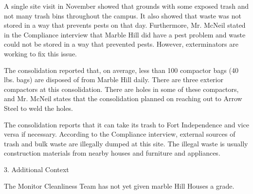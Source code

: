 A single site visit in November showed that grounds with some exposed trash and not many trash bins throughout the campus. It also showed that waste was not stored in a way that prevents pests on that day. Furthermore, Mr. McNeil stated in the Compliance interview that Marble Hill did have a pest problem and waste could not be stored in a way that prevented pests. However, exterminators are working to fix this issue.

The consolidation reported that, on average, less than 100 compactor bags (40 lbs. bags) are disposed of from Marble Hill daily. There are three exterior compactors at this consolidation. There are holes in some of these compactors, and Mr. McNeil states that the consolidation planned on reaching out to Arrow Steel to weld the holes. 

The consolidation reports that it can take its trash to Fort Independence and vice versa if necessary. According to the Compliance interview, external sources of trash and bulk waste are illegally dumped at this site. The illegal waste is usually construction materials from nearby houses and furniture and appliances.  

3. Additional Context 

The Monitor Cleanliness Team has not yet given marble Hill Houses a grade.